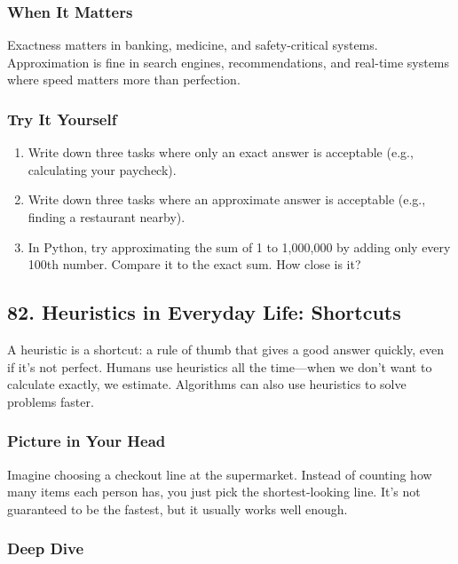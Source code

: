 \documentclass[
  letterpaper,
  DIV=11,
  numbers=noendperiod]{scrreprt}
\providecommand{\tightlist}{%
  \setlength{\itemsep}{0pt}\setlength{\parskip}{0pt}}
\begin{document}
\subsubsection{When It Matters}\label{when-it-matters-79}

Exactness matters in banking, medicine, and safety-critical systems.
Approximation is fine in search engines, recommendations, and real-time
systems where speed matters more than perfection.

\subsubsection{Try It Yourself}\label{try-it-yourself-81}

\begin{enumerate}
\def\labelenumi{\arabic{enumi}.}
\tightlist
\item
  Write down three tasks where only an exact answer is acceptable (e.g.,
  calculating your paycheck).
\item
  Write down three tasks where an approximate answer is acceptable
  (e.g., finding a restaurant nearby).
\item
  In Python, try approximating the sum of 1 to 1,000,000 by adding only
  every 100th number. Compare it to the exact sum. How close is it?
\end{enumerate}

\subsection{82. Heuristics in Everyday Life:
Shortcuts}\label{heuristics-in-everyday-life-shortcuts}

A heuristic is a shortcut: a rule of thumb that gives a good answer
quickly, even if it's not perfect. Humans use heuristics all the
time---when we don't want to calculate exactly, we estimate. Algorithms
can also use heuristics to solve problems faster.

\subsubsection{Picture in Your Head}\label{picture-in-your-head-82}

Imagine choosing a checkout line at the supermarket. Instead of counting
how many items each person has, you just pick the shortest-looking line.
It's not guaranteed to be the fastest, but it usually works well enough.

\subsubsection{Deep Dive}\label{deep-dive-52}
\end{document}

